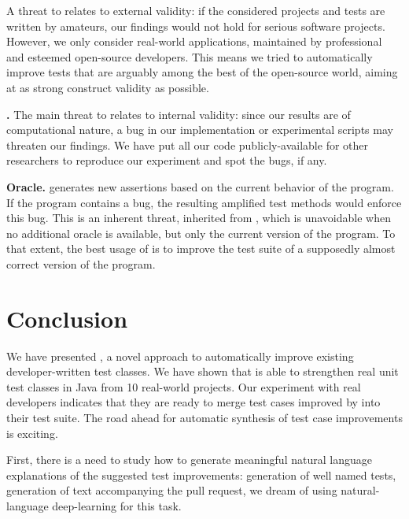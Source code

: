 \textbf{\rqeffectiveness{}}
A threat to \rqeffectiveness{} relates to external validity: if the considered projects and tests are written by amateurs, our findings would not hold for serious software projects.
However, we only consider real-world applications, maintained by professional and esteemed open-source developers. This means we tried to automatically improve tests that are arguably among the best of the open-source world, aiming at as strong construct validity as possible.

\textbf{\rqAmplVersusIAmpl{}.}
The main threat to \rqAmplVersusIAmpl{} relates to internal validity: since our results are of computational nature, a bug in our implementation or experimental scripts may threaten our findings. We have put all our code publicly-available for other researchers to reproduce our experiment and spot the bugs, if any.

\textbf{Oracle.}
\dspot generates new assertions based on the current behavior of the program. If the program contains a bug, the resulting amplified test methods would enforce this bug. This is an inherent threat, inherited from \cite{Xie2006}, which is unavoidable when no additional oracle is available, but only the current version of the program. 
To that extent, the best usage of \dspot is to improve the test suite of a supposedly almost correct version of the program.

\section{Conclusion}
\label{sec:conclusion}

We have presented \dspot, a novel approach to automatically improve existing developer-written test classes.
We have shown that \dspot is able to strengthen real unit test classes in Java from 10 real-world projects. 
Our experiment with real developers indicates that they are ready to merge test cases improved by \dspot into their test suite. 
The road ahead for automatic synthesis of test case improvements is exciting.

First, there is a need to study how to generate meaningful natural language explanations of the suggested test improvements: generation of well named tests, generation of text accompanying the pull request, we dream of using natural-language deep-learning for this task.

